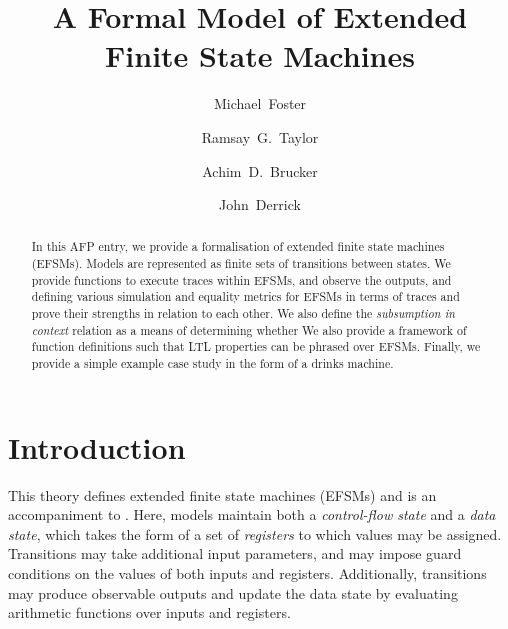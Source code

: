 \documentclass[10pt,DIV16,a4paper,abstract=true,twoside=semi,openright]{scrreprt}
\title{A Formal Model of Extended Finite State Machines}%
\author{Michael~Foster\orcidID{0000-0001-8233-9873} \and
 Ramsay~G.~Taylor\orcidID{0000-0002-4036-7590} \and
 Achim~D.~Brucker\orcidID{0000-0002-6355-1200} \and
 John~Derrick\orcidID{0000-0002-6631-8914}}
\begin{document}
\maketitle
\begin{abstract}
  In this AFP entry, we provide a formalisation of extended finite state machines (EFSMs). Models are represented as finite sets of transitions between states. We provide functions to execute traces within EFSMs, and observe the outputs, and defining various simulation and equality metrics for EFSMs in terms of traces and prove their strengths in relation to each other. We also define the \emph{subsumption in context} relation as a means of determining whether  We also provide a framework of function definitions such that LTL properties can be phrased over EFSMs. Finally, we provide a simple example case study in the form of a drinks machine.
  \begin{quote}
    \bigskip
  \end{quote}
\end{abstract}


\tableofcontents
\cleardoublepage

\chapter{Introduction}
This theory defines extended finite state machines (EFSMs) and is an accompaniment to \cite{foster2018}. Here, models maintain both a \emph{control-flow state} and a \emph{data state}, which takes the form of a set of \emph{registers} to which values may be assigned. Transitions may take additional input parameters, and may impose guard conditions on the values of both inputs and registers. Additionally, transitions may produce observable outputs and update the data state by evaluating arithmetic functions over inputs and registers.
\end{document}
